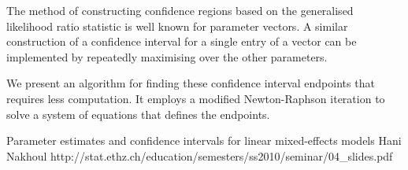 

The method of constructing confidence regions based on the generalised likelihood ratio statistic is well 
known for parameter vectors. A similar construction of a confidence interval for a single entry of a vector 
can be implemented by repeatedly maximising over the other parameters. 

We present an algorithm for finding these confidence interval endpoints that requires less computation. 
It employs a modified Newton-Raphson iteration to solve a system of equations that defines the endpoints.

Parameter estimates and conﬁdence intervals for linear mixed-effects models
Hani Nakhoul
http://stat.ethz.ch/education/semesters/ss2010/seminar/04_slides.pdf

